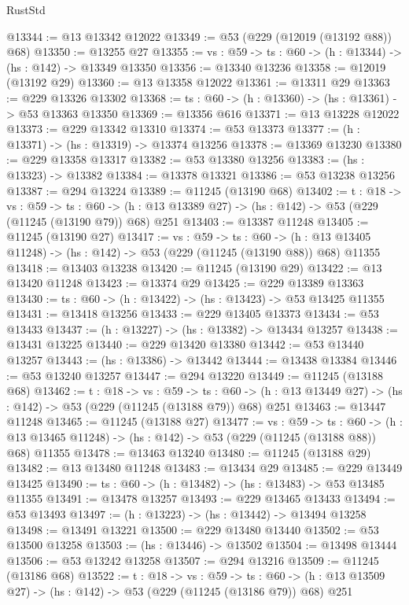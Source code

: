 \begin{lexlean}{RustStd}
\begin{coremodule}
@13344 := @13 @13342 @12022
@13349 := @53 (@229 (@12019 (@13192 @88)) @68)
@13350 := @13255 @27
@13355 := {vs : @59} -> {ts : @60} -> (h : @13344) -> (hs : @142) -> @13349 @13350
@13356 := @13340 @13236
@13358 := @12019 (@13192 @29)
@13360 := @13 @13358 @12022
@13361 := @13311 @29
@13363 := @229 @13326 @13302
@13368 := {ts : @60} -> (h : @13360) -> (hs : @13361) -> @53 @13363 @13350
@13369 := @13356 @616
@13371 := @13 @13228 @12022
@13373 := @229 @13342 @13310
@13374 := @53 @13373
@13377 := (h : @13371) -> (hs : @13319) -> @13374 @13256
@13378 := @13369 @13230
@13380 := @229 @13358 @13317
@13382 := @53 @13380 @13256
@13383 := (hs : @13323) -> @13382
@13384 := @13378 @13321
@13386 := @53 @13238 @13256
@13387 := @294 @13224
@13389 := @11245 (@13190 @68)
@13402 := {t : @18} ->
  {vs : @59} ->
  {ts : @60} -> (h : @13 @13389 @27) -> (hs : @142) -> @53 (@229 (@11245 (@13190 @79)) @68) @251
@13403 := @13387 @11248
@13405 := @11245 (@13190 @27)
@13417 := {vs : @59} ->
  {ts : @60} ->
  (h : @13 @13405 @11248) -> (hs : @142) -> @53 (@229 (@11245 (@13190 @88)) @68) @11355
@13418 := @13403 @13238
@13420 := @11245 (@13190 @29)
@13422 := @13 @13420 @11248
@13423 := @13374 @29
@13425 := @229 @13389 @13363
@13430 := {ts : @60} -> (h : @13422) -> (hs : @13423) -> @53 @13425 @11355
@13431 := @13418 @13256
@13433 := @229 @13405 @13373
@13434 := @53 @13433
@13437 := (h : @13227) -> (hs : @13382) -> @13434 @13257
@13438 := @13431 @13225
@13440 := @229 @13420 @13380
@13442 := @53 @13440 @13257
@13443 := (hs : @13386) -> @13442
@13444 := @13438 @13384
@13446 := @53 @13240 @13257
@13447 := @294 @13220
@13449 := @11245 (@13188 @68)
@13462 := {t : @18} ->
  {vs : @59} ->
  {ts : @60} -> (h : @13 @13449 @27) -> (hs : @142) -> @53 (@229 (@11245 (@13188 @79)) @68) @251
@13463 := @13447 @11248
@13465 := @11245 (@13188 @27)
@13477 := {vs : @59} ->
  {ts : @60} ->
  (h : @13 @13465 @11248) -> (hs : @142) -> @53 (@229 (@11245 (@13188 @88)) @68) @11355
@13478 := @13463 @13240
@13480 := @11245 (@13188 @29)
@13482 := @13 @13480 @11248
@13483 := @13434 @29
@13485 := @229 @13449 @13425
@13490 := {ts : @60} -> (h : @13482) -> (hs : @13483) -> @53 @13485 @11355
@13491 := @13478 @13257
@13493 := @229 @13465 @13433
@13494 := @53 @13493
@13497 := (h : @13223) -> (hs : @13442) -> @13494 @13258
@13498 := @13491 @13221
@13500 := @229 @13480 @13440
@13502 := @53 @13500 @13258
@13503 := (hs : @13446) -> @13502
@13504 := @13498 @13444
@13506 := @53 @13242 @13258
@13507 := @294 @13216
@13509 := @11245 (@13186 @68)
@13522 := {t : @18} ->
  {vs : @59} ->
  {ts : @60} -> (h : @13 @13509 @27) -> (hs : @142) -> @53 (@229 (@11245 (@13186 @79)) @68) @251

\end{coremodule}
\end{lexlean}
